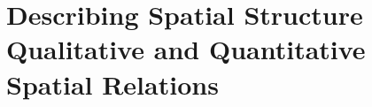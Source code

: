 \chapter{Describing Spatial Structure \\ {\Large Qualitative and Quantitative Spatial Relations}}
\label{chap:QSRs}


